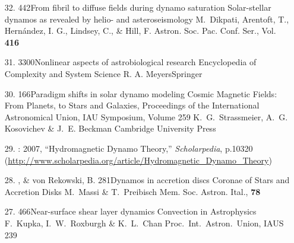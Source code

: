 \begin{itemize}
\item[32.]
\Brandenburg{}
{442}{From fibril to diffuse fields during dynamo saturation}
{Solar-stellar dynamos as revealed by helio- and asteroseismology}
{M.\ Dikpati, Arentoft, T., Hern\'andez, I. G., Lindsey, C., \& Hill, F.}
{Astron. Soc. Pac. Conf. Ser., Vol. {\bf 416}}

\item[31.]
\Brandenburg{}
{3300}{Nonlinear aspects of astrobiological research}
{Encyclopedia of Complexity and System Science}
{R. A. Meyers}{Springer}

\item[30.]
\Brandenburg{}
{166}{Paradigm shifts in solar dynamo modeling}
{Cosmic Magnetic Fields: From Planets, to Stars and Galaxies,
Proceedings of the International Astronomical Union, IAU Symposium, Volume 259}
{K.\ G.\ Strassmeier, A.\ G. Kosovichev \& J.\ E. Beckman}
{Cambridge University Press}

\item[29.]
\Brandenburg: 2007, ``Hydromagnetic Dynamo Theory,'' {\it Scholarpedia},
p.10320 \\
(\url{http://www.scholarpedia.org/article/Hydromagnetic_Dynamo_Theory})

\item[28.]
\Brandenburg, \& von Rekowski, B.
{281}{Dynamos in accretion discs}
{Coronae of Stars and Accretion Disks}
{M.\ Massi \& T.\ Preibisch}
{Mem. Soc. Astron. Ital., {\bf 78}}

\item[27.]
\Brandenburg{}
{466}{Near-surface shear layer dynamics}
{Convection in Astrophysics}
{F.\ Kupka, I.\ W.\ Roxburgh \& K.\ L.\ Chan}
{Proc.\ Int.\ Astron.\ Union, IAUS 239}


\end{itemize}
